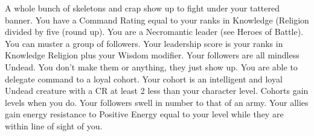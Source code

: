 {A whole bunch of skeletons and crap show up to fight under your tattered banner.}
{You have a Command Rating equal to your ranks in Knowledge (Religion divided by five (round up). You are a Necromantic leader (see Heroes of Battle).}
{You can muster a group of followers. Your leadership score is your ranks in Knowledge Religion plus your Wisdom modifier. Your followers are all mindless Undead. You don't make them or anything, they just show up.}
{You are able to delegate command to a loyal cohort. Your cohort is an intelligent and loyal Undead creature with a CR at least 2 less than your character level. Cohorts gain levels when you do.}
{Your followers swell in number to that of an army.}
{Your allies gain energy resistance to Positive Energy equal to your level while they are within line of sight of you.}